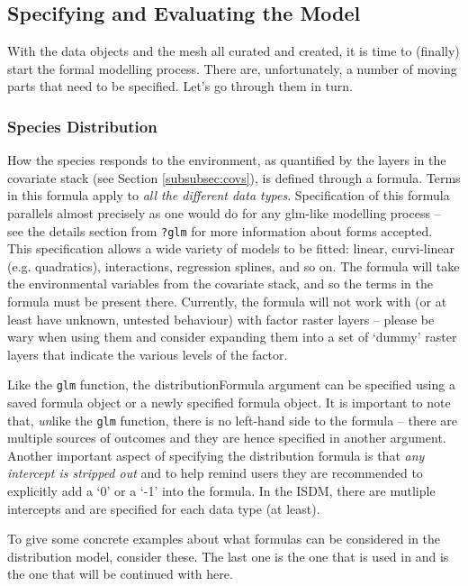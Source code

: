 \documentclass[article,shortnames,nojss]{jss}\usepackage[]{graphicx}\usepackage[]{xcolor}
\begin{document}
\subsection*{Specifying and Evaluating the Model} \label{subsec:mod}

With the data objects and the mesh all curated and created, it is time to (finally) start the formal modelling process. There are, unfortunately, a number of moving parts that need to be specified. Let's go through them in turn.
  
\subsubsection*{Species Distribution}\label{subsubsec:disForm}
  
How the species responds to the environment, as quantified by the layers in the covariate stack (see Section \ref{subsubsec:covs}), is defined through a formula. Terms in this formula apply to \textit{all the different data types}. Specification of this formula parallels almost precisely as one would do for any glm-like modelling process -- see the details section from \texttt{?glm} for more information about forms accepted. This specification allows a wide variety of models to be fitted: linear, curvi-linear (e.g. quadratics), interactions, regression splines, and so on. The formula will take the environmental variables from the covariate stack, and so the terms in the formula must be present there. Currently, the formula will not work with (or at least have unknown, untested behaviour) with factor raster layers -- please be wary when using them and consider expanding them into a set of `dummy' raster layers that indicate the various levels of the factor. 

Like the \texttt{glm} function, the distributionFormula argument can be specified using a saved formula object or a newly specified formula object. It is important to note that, \textit{un}like the \texttt{glm} function, there is no left-hand side to the formula -- there are multiple sources of outcomes and they are hence specified in another argument. Another important aspect of specifying the distribution formula is that \textit{any intercept is stripped out} and to help remind users they are recommended to explicitly add a `0' or a `-1' into the formula. In the ISDM, there are mutliple intercepts and are specified for each data type (at least).

To give some concrete examples about what formulas can be considered in the distribution model, consider these. The last one is the one that is used in \citet{fos24} and is the one that will be continued with here.
\end{document}
